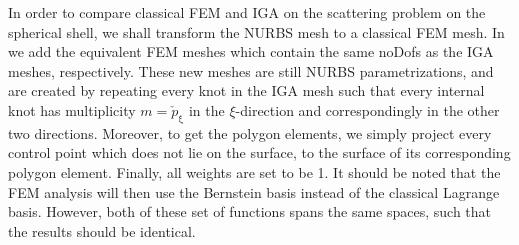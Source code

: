 In order to compare classical FEM and IGA on the scattering problem on the spherical shell, we shall transform the NURBS mesh to a classical FEM mesh. In~ we add the equivalent FEM meshes which contain the same noDofs as the IGA meshes, respectively. These new meshes are still NURBS parametrizations, and are created by repeating every knot in the IGA mesh such that every internal knot has multiplicity $m=\check{p}_\upxi$ in the $\xi$-direction and correspondingly in the other two directions. Moreover, to get the polygon elements, we simply project every control point which does not lie on the surface, to the surface of its corresponding polygon element. Finally, all weights are set to be 1. It should be noted that the FEM analysis will then use the Bernstein basis instead of the classical Lagrange basis. However, both of these set of functions spans the same spaces, such that the results should be identical.
